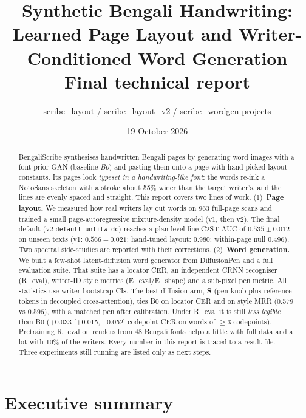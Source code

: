 \documentclass[10.5pt,a4paper]{article}
\title{\textbf{Synthetic Bengali Handwriting:\\ Learned Page Layout and Writer-Conditioned Word Generation}\\[4pt]
\large Final technical report}
\author{scribe\_layout / scribe\_layout\_v2 / scribe\_wordgen projects}
\date{19 October 2026}
\newcommand{\ci}[2]{{\footnotesize[#1,\,#2]}}
\begin{document}
\maketitle

\begin{abstract}
\noindent BengaliScribe synthesises handwritten Bengali pages by generating word images with a font-prior GAN (baseline
\emph{B0}) and pasting them onto a page with hand-picked layout constants. Its pages look \emph{typeset in a handwriting-like
font}: the words re-ink a NotoSans skeleton with a stroke about 55\% wider than the target writer's, and the lines are evenly
spaced and straight. This report covers two lines of work. (1)~\textbf{Page layout.} We measured how real writers lay out
words on 963 full-page scans and trained a small page-autoregressive mixture-density model (v1, then v2). The final default
(v2 \texttt{default\_unfitw\_dc}) reaches a plan-level line C2ST AUC of $0.535\pm0.012$ on unseen texts (v1: $0.566\pm0.021$;
hand-tuned layout: 0.980; within-page null 0.496). Two spectral side-studies are reported with their corrections.
(2)~\textbf{Word generation.} We built a few-shot latent-diffusion word generator from DiffusionPen and a full evaluation suite.
That suite has a locator CER, an independent CRNN recogniser (R\_eval), writer-ID style metrics (E\_eval/E\_shape) and a
sub-pixel pen metric. All statistics use writer-bootstrap CIs. The best diffusion arm, \textbf{S} (pen knob plus reference
tokens in decoupled cross-attention), ties B0 on locator CER and on style MRR (0.579 vs 0.596), with a matched pen after
calibration. Under R\_eval it is still \emph{less legible} than B0 ($+0.033$ \ci{+0.015}{+0.052} codepoint CER on words of
$\ge$3 codepoints). Pretraining R\_eval on renders from 48 Bengali fonts helps a little with full data and a lot with 10\% of
the writers. Every number in this report is traced to a result file. Three experiments still running are listed only as
next steps.
\end{abstract}

\tableofcontents
\newpage

\section{Executive summary}
\label{sec:exec}
\end{document}
